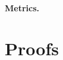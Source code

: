 \documentclass{article}
\begin{document}



\paragraph{Metrics.}




\section{Proofs}
\label{sec:proofs}
\end{document}
